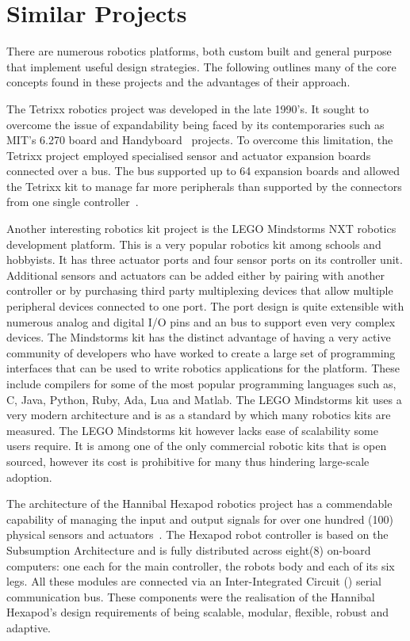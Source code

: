 \section{Similar Projects} %
\label{sec:similar}

There are numerous robotics platforms, both custom built and general purpose that implement useful design strategies. The following outlines many of the core concepts found in these projects and the advantages of their approach.

The Tetrixx robotics project was developed in the late 1990's. It sought to overcome the issue of expandability being faced by its contemporaries such as MIT's 6.270 board and Handyboard~\parencite{handy} projects. To overcome this limitation, the Tetrixx project employed specialised sensor and actuator expansion boards connected over a bus. The bus supported up to 64 expansion boards and allowed the Tetrixx kit to manage far more peripherals than supported by the connectors from one single controller~\parencite{tetrixx}.

Another interesting robotics kit project is the LEGO Mindstorms NXT robotics development platform. This is a very popular robotics kit among schools and hobbyists. It has three actuator ports and four sensor ports on its controller unit. Additional sensors and actuators can be added either by pairing with another controller or by purchasing third party multiplexing devices that allow multiple peripheral devices connected to one port. The port design is quite extensible with numerous analog and digital I/O pins and an \iic bus to support even very complex devices. The Mindstorms kit has the distinct advantage of having a very active community of developers who have worked to create a large set of programming interfaces that can be used to write robotics applications for the platform. These include compilers for some of the most popular programming languages such as, C, Java, Python, Ruby, Ada, Lua and Matlab. The LEGO Mindstorms kit uses a very modern architecture and is as a standard by which many robotics kits are measured. The LEGO Mindstorms kit however lacks ease of scalability some users require. It is among one of the only commercial robotic kits that is open sourced, however its cost is prohibitive for many thus hindering large-scale adoption. 

The architecture of the Hannibal Hexapod robotics project has a commendable capability of managing the input and output signals for over one hundred (100) physical sensors and actuators~\parencite{hannibal}. The Hexapod robot controller is based on the Subsumption Architecture and is fully distributed across eight(8) on-board computers: one each for the main controller, the robots body and each of its six legs. All these modules are connected via an Inter-Integrated Circuit (\iic) serial communication bus. These components were the realisation of the Hannibal Hexapod's design requirements of being scalable, modular, flexible, robust and adaptive.

